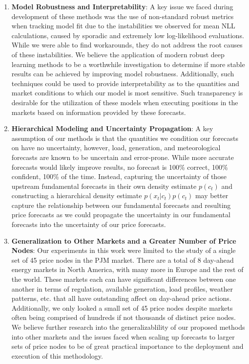 \begin{enumerate}
    \item \textbf{Model Robustness and Interpretability}: A key issue we faced during development of these methods was
          the use of non-standard robust metrics when tracking model fit due to the instabilities we observed for mean
          NLL calculations, caused by sporadic and extremely low log-likelihood evaluations.
          While we were able to find workarounds, they do not address the root causes of these instabilities.
          We believe the application of modern robust deep learning methods to be a worthwhile investigation to determine
          if more stable results can be achieved by improving model robustness.
          Additionally, such techniques could be used to provide interpretability as to the quantities and market
          conditions to which our model is most sensitive.
          Such transparency is desirable for the utilization of these models when executing positions in the markets
          based on information provided by these forecasts.
    \item \textbf{Hierarchical Modeling and Uncertainty Propagation}: A key assumption of our methods is that the
          quantities we condition our forecasts on have no uncertainty, however, load, generation, and meteorological
          forecasts are known to be uncertain and error-prone.
          While more accurate forecasts would likely improve results, no forecast is 100\% correct, 100\% confident, 100\%
          of the time.
          Instead, capturing the uncertainty of those upstream fundamental forecasts in their own density estimate
          $p(c_t)$ and constructing a hierarchical density estimate $p(x_t|c_t)p(c_t)$ may better capture the
          relationship between our fundamental forecasts and resulting price forecasts as we could propagate the
          uncertainty in our fundamental forecasts into the uncertainty of our price forecasts.
    \item \textbf{Generalization to Other Markets and a Greater Number of Price Nodes}: Our experiments in this work
          were limited to the study of a single set of 45 price nodes in the PJM market.
          There are a total of 8 day-ahead energy markets in North America, with many more in Europe and the rest of the
          world.
          These markets each can have significant differences between one another in terms of regulation, available
          generation, load profiles, weather patterns, etc. that all have outstanding affect on day-ahead price actions.
          Additionally, we only looked a small set of 45 price nodes despite markets often being comprised of hundreds
          if not thousands of distinct price nodes.
          We believe further research into the generalizablility of our proposed methods into other markets and the
          issues faced when scaling up forecasts to larger sets of price nodes to be of great practical importance to
          the deployment and execution of this methodology.
\end{enumerate}
